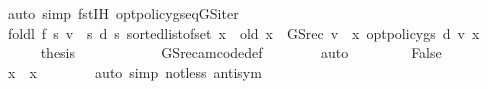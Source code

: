 \begin{isabellebody}
\ {\isacharparenleft}{\kern0pt}auto\ simp{\isacharcolon}{\kern0pt}\ fst{\isacharunderscore}{\kern0pt}IH{\isacharprime}{\kern0pt}{\isacharprime}{\kern0pt}\ opt{\isacharunderscore}{\kern0pt}policy{\isacharunderscore}{\kern0pt}gs{\isacharprime}{\kern0pt}{\isacharunderscore}{\kern0pt}eq{\isacharunderscore}{\kern0pt}GS{\isacharunderscore}{\kern0pt}iter{\isacharprime}{\kern0pt}{\isacharparenright}{\kern0pt}\isanewline
\ \ \ \ \isamarkupfalse%
\ \isamarkupfalse%
\ {\isachardoublequoteopen}foldl\ {\isacharquery}{\kern0pt}f\ {\isacharparenleft}{\kern0pt}{\isasymlambda}s{\isachardot}{\kern0pt}\ {\isacharparenleft}{\kern0pt}v\ {\isachardollar}{\kern0pt}\ s{\isacharcomma}{\kern0pt}\ d\ s{\isacharparenright}{\kern0pt}{\isacharparenright}{\kern0pt}\ {\isacharparenleft}{\kern0pt}sorted{\isacharunderscore}{\kern0pt}list{\isacharunderscore}{\kern0pt}of{\isacharunderscore}{\kern0pt}set\ {\isacharbraceleft}{\kern0pt}{\isachardot}{\kern0pt}{\isachardot}{\kern0pt}x{\isacharbraceright}{\kern0pt}{\isacharparenright}{\kern0pt}\ {\isacharequal}{\kern0pt}\ {\isacharparenleft}{\kern0pt}{\isacharquery}{\kern0pt}old\ {\isacharparenleft}{\kern0pt}x\ {\isacharcolon}{\kern0pt}{\isacharequal}{\kern0pt}\ {\isacharparenleft}{\kern0pt}GS{\isacharunderscore}{\kern0pt}rec\ v\ {\isachardollar}{\kern0pt}\ x{\isacharcomma}{\kern0pt}\ opt{\isacharunderscore}{\kern0pt}policy{\isacharunderscore}{\kern0pt}gs{\isacharprime}{\kern0pt}\ d\ v\ x{\isacharparenright}{\kern0pt}{\isacharparenright}{\kern0pt}{\isacharparenright}{\kern0pt}{\isachardoublequoteclose}\isacommand{{\isachardot}{\kern0pt}}\isamarkupfalse%
\isanewline
\ \ \ \ \isamarkupfalse%
\ {\isacharquery}{\kern0pt}thesis\ \ \ \ \isanewline
\ \ \ \ \ \ \isamarkupfalse%
\ GS{\isacharunderscore}{\kern0pt}rec{\isacharunderscore}{\kern0pt}am{\isacharunderscore}{\kern0pt}code{\isacharunderscore}{\kern0pt}def\isanewline
\ \ \ \ \ \ \isamarkupfalse%
\ auto\isanewline
\ \ \isamarkupfalse%
\isanewline
\ \ \ \ \isamarkupfalse%
\ {\isacharparenleft}{\kern0pt}False{\isacharparenright}{\kern0pt}\isanewline
\ \ \ \ \isamarkupfalse%
\ {\isachardoublequoteopen}{\isacharbraceleft}{\kern0pt}{\isachardot}{\kern0pt}{\isachardot}{\kern0pt}x{\isacharbraceright}{\kern0pt}\ {\isacharequal}{\kern0pt}\ {\isacharbraceleft}{\kern0pt}x{\isacharbraceright}{\kern0pt}{\isachardoublequoteclose}\isanewline
\ \ \ \ \ \ \isamarkupfalse%
\ {\isacharparenleft}{\kern0pt}auto\ simp{\isacharcolon}{\kern0pt}\ not{\isacharunderscore}{\kern0pt}less\ antisym{\isacharparenright}{\kern0pt}\isanewline

\end{isabellebody}
